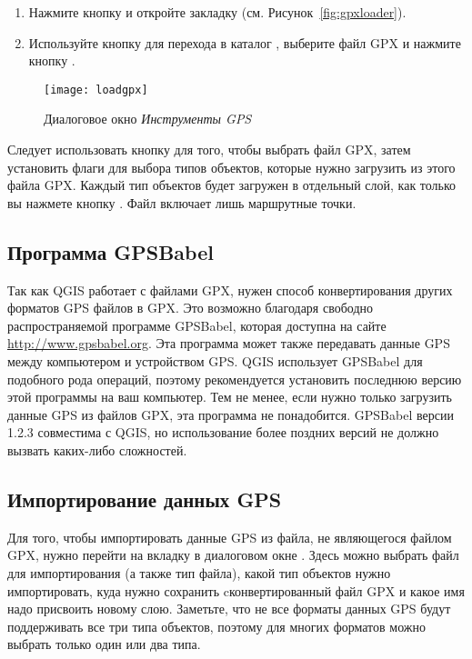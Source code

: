 \begin{enumerate}
\item Нажмите кнопку  и
откройте закладку  (см. Рисунок~\ref{fig:gpxloader}).
\item Используйте кнопку  для перехода в каталог
, выберите файл GPX
 и нажмите кнопку .
\end{enumerate}

\begin{figure}[ht]
   \centering
   \texttt{[image: loadgpx]}
   \caption{Диалоговое окно \emph{Инструменты GPS} \nixcaption}\label{gpxloader}
\end{figure}

Следует использовать кнопку \browsebutton для того, чтобы выбрать файл
GPX, затем установить флаги для выбора типов объектов, которые нужно
загрузить из этого файла GPX. Каждый тип объектов будет загружен в
отдельный слой, как только вы нажмете кнопку . Файл
 включает лишь маршрутные точки.

\subsection{Программа GPSBabel}

Так как QGIS работает с файлами GPX, нужен способ конвертирования других
форматов GPS файлов в GPX. Это возможно благодаря свободно
распространяемой программе GPSBabel, которая доступна на сайте
\url{http://www.gpsbabel.org}. Эта программа может также передавать
данные GPS между компьютером и устройством GPS. QGIS использует GPSBabel
для подобного рода операций, поэтому рекомендуется установить последнюю
версию этой программы на ваш компьютер. Тем не менее, если нужно только
загрузить данные GPS из файлов GPX, эта программа не понадобится.
GPSBabel версии 1.2.3 совместима с QGIS, но использование более поздних
версий не должно вызвать каких-либо сложностей.

\subsection{Импортирование данных GPS}

Для того, чтобы импортировать данные GPS из файла, не являющегося файлом
GPX, нужно перейти на вкладку  в диалоговом окне
. Здесь можно выбрать файл для импортирования
(а также тип файла), какой тип объектов нужно импортировать, куда нужно
сохранить cконвертированный файл GPX и какое имя надо присвоить новому
слою. Заметьте, что не все форматы данных GPS будут поддерживать все
три типа объектов, поэтому для многих форматов можно выбрать только один
или два типа.


